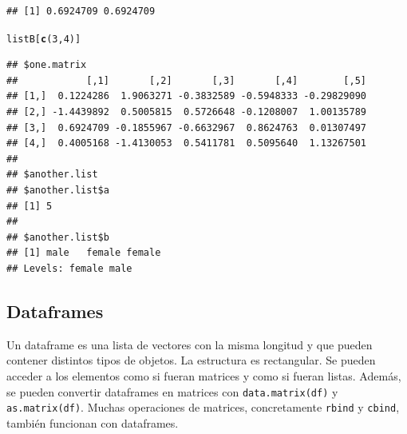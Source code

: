 \documentclass{config/apuntes}\usepackage[]{graphicx}\usepackage[]{xcolor}
\makeatletter
\newcommand{\hlnum}[1]{\textcolor[rgb]{0.686,0.059,0.569}{#1}}%
\newcommand{\hldef}[1]{\textcolor[rgb]{0.345,0.345,0.345}{#1}}%
\newcommand{\hlkwd}[1]{\textcolor[rgb]{0.737,0.353,0.396}{\textbf{#1}}}%
\newenvironment{kframe}{%
 \def\at@end@of@kframe{}%
 \ifinner\ifhmode%
  \def\at@end@of@kframe{\end{minipage}}%
  \begin{minipage}{\columnwidth}%
 \fi\fi%
 \def\FrameCommand##1{\hskip\@totalleftmargin \hskip-\fboxsep
 \colorbox{shadecolor}{##1}\hskip-\fboxsep
     \hskip-\linewidth \hskip-\@totalleftmargin \hskip\columnwidth}%
 \MakeFramed {\advance\hsize-\width
   \@totalleftmargin\z@ \linewidth\hsize
   \@setminipage}}%
 {\par\unskip\endMakeFramed%
 \at@end@of@kframe}
\newenvironment{knitrout}{}{} %
\newcommand{\code}[1]{\texttt{#1}}
\makeatother
\begin{document}
\begin{knitrout}
\begin{kframe}
\begin{alltt}
\end{alltt}
\begin{verbatim}
## [1] 0.6924709 0.6924709
\end{verbatim}
\begin{alltt}
\hldef{listB[}\hlkwd{c}\hldef{(}\hlnum{3}\hldef{,} \hlnum{4}\hldef{)]}
\end{alltt}
\begin{verbatim}
## $one.matrix
##            [,1]       [,2]       [,3]       [,4]        [,5]
## [1,]  0.1224286  1.9063271 -0.3832589 -0.5948333 -0.29829090
## [2,] -1.4439892  0.5005815  0.5726648 -0.1208007  1.00135789
## [3,]  0.6924709 -0.1855967 -0.6632967  0.8624763  0.01307497
## [4,]  0.4005168 -1.4130053  0.5411781  0.5095640  1.13267501
## 
## $another.list
## $another.list$a
## [1] 5
## 
## $another.list$b
## [1] male   female female
## Levels: female male
\end{verbatim}
\end{kframe}
\end{knitrout}

\subsection{Dataframes}
Un dataframe es una lista de vectores con la misma longitud y que pueden contener distintos tipos de objetos. La estructura es rectangular. Se pueden acceder a los elementos como si fueran matrices y como si fueran listas. Además, se pueden convertir dataframes en matrices con \code{data.matrix(df)} y \code{as.matrix(df)}. Muchas operaciones de matrices, concretamente \code{rbind} y \code{cbind}, también funcionan con dataframes.
\end{document}

